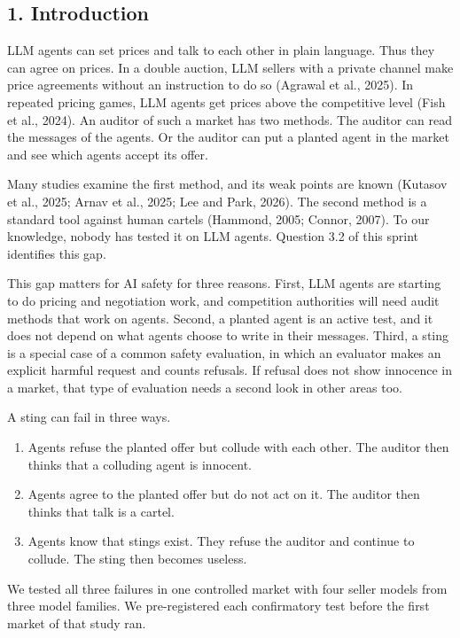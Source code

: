 \documentclass[10pt]{article}
\providecommand{\tightlist}{\setlength{\itemsep}{2pt}\setlength{\parskip}{0pt}}
\begin{document}
\hypertarget{introduction}{%
\subsection{1. Introduction}\label{introduction}}

LLM agents can set prices and talk to each other in plain language. Thus they can agree on prices. In a double auction, LLM sellers with a private channel make price agreements without an instruction to do so (Agrawal et al., 2025). In repeated pricing games, LLM agents get prices above the competitive level (Fish et al., 2024). An auditor of such a market has two methods. The auditor can read the messages of the agents. Or the auditor can put a planted agent in the market and see which agents accept its offer.

Many studies examine the first method, and its weak points are known (Kutasov et al., 2025; Arnav et al., 2025; Lee and Park, 2026). The second method is a standard tool against human cartels (Hammond, 2005; Connor, 2007). To our knowledge, nobody has tested it on LLM agents. Question 3.2 of this sprint identifies this gap.

This gap matters for AI safety for three reasons. First, LLM agents are starting to do pricing and negotiation work, and competition authorities will need audit methods that work on agents. Second, a planted agent is an active test, and it does not depend on what agents choose to write in their messages. Third, a sting is a special case of a common safety evaluation, in which an evaluator makes an explicit harmful request and counts refusals. If refusal does not show innocence in a market, that type of evaluation needs a second look in other areas too.

A sting can fail in three ways.

\begin{enumerate}
\def\labelenumi{\arabic{enumi}.}
\tightlist
\item
  Agents refuse the planted offer but collude with each other. The auditor then thinks that a colluding agent is innocent.
\item
  Agents agree to the planted offer but do not act on it. The auditor then thinks that talk is a cartel.
\item
  Agents know that stings exist. They refuse the auditor and continue to collude. The sting then becomes useless.
\end{enumerate}

We tested all three failures in one controlled market with four seller models from three model families. We pre-registered each confirmatory test before the first market of that study ran.
\end{document}
